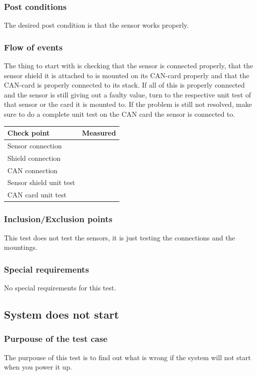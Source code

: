 \documentclass[10pt,a4paper]{article}
\begin{document}
\subsubsection*{Post conditions}
The desired post condition is that the sensor works properly. 
\subsubsection*{Flow of events}
The thing to start with is checking that the sensor is connected properly, that the sensor shield it is attached to is mounted on its CAN-card properly and that the CAN-card is properly connected to its stack. If all of this is properly connected and the sensor is still giving out a faulty value, turn to the respective unit test of that sensor or the card it is mounted to. If the problem is still not resolved, make sure to do a complete unit test on the CAN card the sensor is connected to.

\begin{tabular}{| l | c |}
\hline
Check point & Measured \\ \hline
Sensor connection &  \\ \hline
Shield connection &  \\ \hline
CAN connection & \\ \hline
Sensor shield unit test & \\ \hline
CAN card unit test & \\ \hline
\end{tabular}   
\subsubsection*{Inclusion/Exclusion points}
This test does not test the sensors, it is just testing the connections and the mountings. 
\subsubsection*{Special requirements}
No special requirements for this test. 

\subsection{System does not start}
\label{nostart}
\subsubsection*{Purpouse of the test case}
The purpouse of this test is to find out what is wrong if the system will not start when you power it up. 
\end{document}
